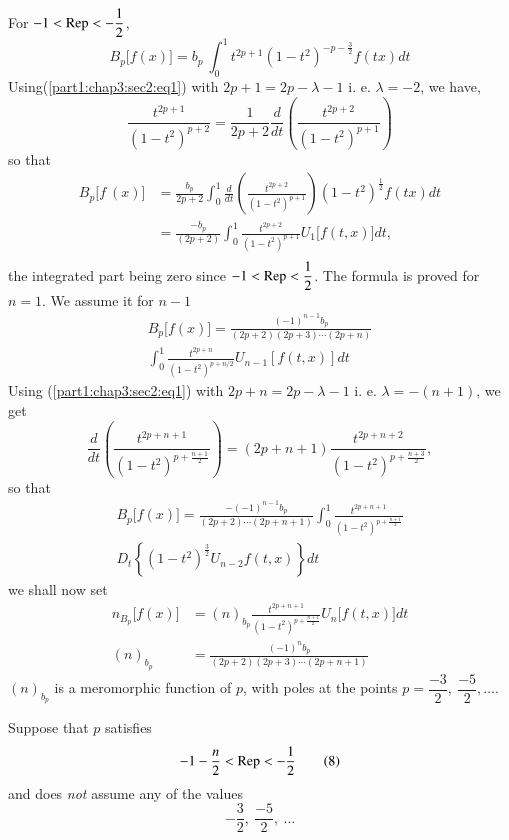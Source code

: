 For $-1 < \operatorname{Rep} < -\dfrac{1}{2}$,
$$
B_p \big[ f(x) \big] = b_p ~ \int^1_0 t^{2p+1}
(1-t^2)^{-p-\frac{3}{2}} f (tx) dt 
$$
Using\pageoriginale (\ref{part1:chap3:sec2:eq1}) with $2p+1 = 2p- \lambda - 1$ i. e. $\lambda = -2 $, we have,
$$
\frac{t^{2p+1}}{(1-t^2)^{p+2}} = \frac{1}{2p+2} \frac{d}{dt} (
\frac{t^{2p+2}}{(1-t^2)^{p+1}}) 
$$
so that
\begin{align*}
  B_p \big[ f ~ (x) \big] &= \frac{b_p}{2p+2} \int^1_0 \frac{d}{dt} (
  \frac{t^{2p+2}}{(1-t^2)^{p+1}}) (1-t^2)^{\frac{1}{2}} f(tx) dt \\ 
  &= \frac{-b_p}{(2p+2)} \int^1_0 \frac{t^{2p+2}}{(1-t^2)^{p+1}} U_1
  \big[ f (t, x) \big] dt,\\ 
\end{align*}
the integrated part being zero since $-1 < \operatorname{Rep} < \dfrac{1}{2}$. The
formula is proved for $n=1$. We assume it for $n-1$ 
\begin{multline*}
  B_p \big[ f (x) \big] = \frac{(-1)^{n-1} b_p}{(2p+2) (2p+3) \cdots
  (2p+n)}\\ 
  \int^1_0 \frac{t^{2p+n}}{(1-t^2)^{p+n/2}} U_{n-1} [f(t, x)] dt 
\end{multline*}
Using (\ref{part1:chap3:sec2:eq1}) with $2p+n = 2p-\lambda -1$ i. e. $\lambda = -(n+1)$, we get
$$
\frac{d}{dt} \left( \frac{t^{2p+n+1}}{(1-t^2)^{p+\frac{n+1}{2}}}\right) =
(2p+n+1) \frac{t^{2p+n+2}}{(1-t^2)^{p+\frac{n+3}{2}}}, 
$$
so that  
\begin{multline*}
  B_p \big[ f (x) \big] = \frac{-(-1)^{n-1} b_p}{(2p+2)\cdots (2p+n+1)}
  \int^1_0 \frac{t^{2p+n+1}}{(1-t^2)^{p+\frac{n+1}{2}}}\\ 
  D_t \left\{
  (1-t^2)^{\frac{3}{2}} U_{n-2} f (t, x) \right\} dt 
\end{multline*}
we shall now set 
\begin{align}
  n_{B_{p}} \big[ f (x) \big] &= (n)_{b_{p}}
  \frac{t^{2p+n+1}}{(1-t^2)^{p+\frac{n+1}{2}}} U_n \big[ f (t, x)
    \big] dt  \tag{6}\label{part1:chap3:sec2:eq6}\\ 
  (n)_{b_{p}} &= \frac{(-1)^n b_p}{(2p+2) (2p+3)\cdots (2p+n+1)}
  \tag{7}\label{part1:chap3:sec2:eq7}  
\end{align} 
$(n)_{b_{p}}$ is a meromorphic function of $p$, with poles at the
points\break  
$p = \dfrac{-3}{2}, ~ \dfrac{-5}{2}, \ldots$.

\begin{proposition}\label{part1:chap3:sec2:prop4}%
Suppose that $p$ satisfies
\begin{equation}
  -1 - \frac{n}{2} < \operatorname{Rep} < - \frac{1}{2} \tag{8}\label{part1:chap3:sec2:eq8}
\end{equation}
and does \textit{not} assume any of the values 
\begin{equation}
  -\frac{3}{2}, ~ \frac{-5}{2}, ~ \ldots \tag{9}\label{part1:chap3:sec2:eq9} 
\end{equation}
\end{proposition}

